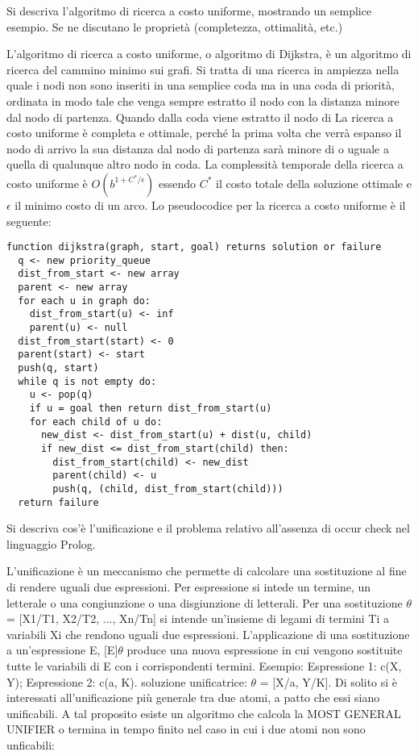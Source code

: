 \documentclass[answers, a4paper, 11pt]{exam}
\begin{document}
\begin{questions}
\question Si descriva l’algoritmo di ricerca a costo uniforme, mostrando un semplice esempio. Se ne discutano le
proprietà (completezza, ottimalità, etc.)
\begin{solution}
	L'algoritmo di ricerca a costo uniforme, o algoritmo di Dijkstra, è un algoritmo di ricerca del cammino minimo sui grafi. 
  Si tratta di una ricerca in ampiezza nella quale i nodi non sono inseriti in una semplice coda ma in una coda di priorità, ordinata in modo tale che venga sempre estratto il nodo con la distanza minore dal nodo di partenza. 
  Quando dalla coda viene estratto il nodo di 
  La ricerca a costo uniforme è completa e ottimale, perché la prima volta che verrà espanso il nodo di arrivo la sua distanza dal nodo di partenza sarà minore di o uguale a quella di qualunque altro nodo in coda. 
  La complessità temporale della ricerca a costo uniforme è $O(b^{1 + C^*/\epsilon})$ essendo $C^*$ il costo totale della soluzione ottimale  e $\epsilon$ il minimo costo di un arco. 
	Lo pseudocodice per la ricerca a costo uniforme è il seguente:
  \begin{verbatim}
function dijkstra(graph, start, goal) returns solution or failure
  q <- new priority_queue
  dist_from_start <- new array
  parent <- new array
  for each u in graph do:
    dist_from_start(u) <- inf
    parent(u) <- null
  dist_from_start(start) <- 0
  parent(start) <- start
  push(q, start)
  while q is not empty do:
    u <- pop(q)
    if u = goal then return dist_from_start(u)
    for each child of u do:
      new_dist <- dist_from_start(u) + dist(u, child) 
      if new_dist <= dist_from_start(child) then:
        dist_from_start(child) <- new_dist
        parent(child) <- u
        push(q, (child, dist_from_start(child)))
  return failure
	\end{verbatim}
\end{solution}
\question Si descriva cos’è l'unificazione e il problema relativo all’assenza di occur check nel linguaggio Prolog.
\begin{solution}
  L'unificazione è un meccanismo che permette di calcolare una sostituzione al fine di rendere uguali due espressioni. Per espressione si intede un termine, un letterale o una congiunzione o una disgiunzione di letterali.
  Per una sostituzione $\theta$ = [X1/T1, X2/T2, ..., Xn/Tn] si intende un'insieme di legami di termini Ti a variabili Xi che rendono uguali due espressioni. L'applicazione di una sostituzione a un'espressione E, [E]$\theta$ produce una nuova espressione in cui vengono sostituite tutte le variabili di E con i corrispondenti termini.
  Esempio: Espressione 1: c(X, Y); Espressione 2: c(a, K). soluzione unificatrice: $\theta$ = [X/a, Y/K]. \newline
  Di solito si è interessati all'unificazione più generale tra due atomi, a patto che essi siano unificabili. A tal proposito esiste un algoritmo che calcola la MOST GENERAL UNIFIER o termina in tempo finito nel caso in cui i due atomi non sono unficabili:


\end{solution}
\end{questions}
\end{document}
